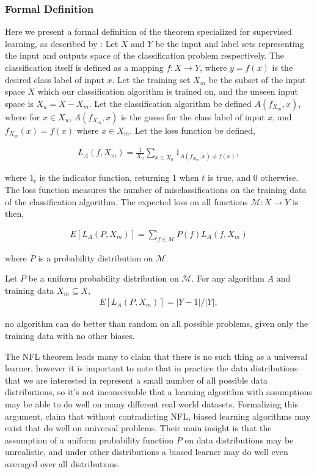 \documentclass[thesis]{subfiles}
\begin{document}
\subsubsection{Formal Definition}
Here we present a formal definition of the theorem specialized for supervised learning, as described by \citet{lattimore2013no}: Let $X$ and $Y$ be the input and label sets representing the input and outputs space of the classification problem respectively. The classification itself is defined as a mapping $f: X \to Y$, where $y=f(x)$ is the desired class label of input $x$. Let the training set $X_m$ be the subset of the input space $X$ which our classification algorithm is trained on, and the unseen input space is $X_u = X - X_m$. Let the classification algorithm be defined $A(f_{X_{m}}, x)$, where for $x \in X_u$, $A(f_{X_{m}}, x)$ is the guess for the class label of input $x$, and $f_{X_{m}}(x) = f(x)$ where $x\in X_m$. Let the loss function be defined,

\begin{align}
    L_A(f, X_m) = \frac{1}{X_u} \sum_{x\in X_u} 1_{A(f_{X_m}, x) \neq f(x)},
\end{align}

where $1_{t}$ is the indicator function, returning 1 when $t$ is true, and 0 otherwise. The loss function measures the number of misclassifications on the training data of the classification algorithm. The expected loss on all functions $\mathcal{M}: X \to Y$ is then,

\begin{align}
    E\left[ L_A\left(P, X_m\right) \right] = \sum_{f\in \mathcal{M}} P(f)L_A(f, X_m)
\end{align} 

where $P$ is a probability distribution on $\mathcal{M}$.

\begin{theorem}\label{NFL}
Let $P$ be a uniform probability distribution on $\mathcal{M}$. For any algorithm $A$ and training data $X_m\subseteq X$,
\begin{align}
    E\left[ L_A\left(P, X_m\right) \right] = | Y - 1 |/|Y|,
\end{align}
\end{theorem}

\ie no algorithm can do better than random on all possible problems, given only the training data with no other biases.

The NFL theorem leads many to claim that there is no such thing as a universal learner, however it is important to note that in practice the data distributions that we are interested in represent a small number of all possible data distributions, so it's not inconceivable that a learning algorithm with assumptions may be able to do well on many different real world datasets. Formalizing this argument, \citet{lattimore2013no} claim that without contradicting NFL, biased learning algorithms may exist that do well on universal problems. Their main insight is that the assumption of a uniform probability function $P$ on data distributions may be unrealistic, and under other distributions a biased learner may do well even averaged over all distributions.
\end{document}
